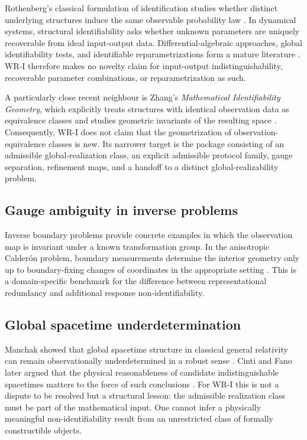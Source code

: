 \documentclass[11pt]{article}
\begin{document}
Rothenberg's classical formulation of identification studies whether distinct
underlying structures induce the same observable probability law
\cite{Rothenberg1971}. In dynamical systems, structural identifiability asks
whether unknown parameters are uniquely recoverable from ideal input-output
data. Differential-algebraic approaches, global identifiability tests, and
identifiable reparametrizations form a mature literature
\cite{Saccomani2003,Bellu2007,Villaverde2016,MeshkatSullivant2014}.
WR-I therefore makes no novelty claim for input-output indistinguishability,
recoverable parameter combinations, or reparametrization as such.

A particularly close recent neighbour is Zhang's \emph{Mathematical
Identifiability Geometry}, which explicitly treats structures with identical
observation data as equivalence classes and studies geometric invariants of the
resulting space \cite{Zhang2026}. Consequently, WR-I does not claim that the
geometrization of observation-equivalence classes is new. Its narrower target
is the package consisting of an admissible global-realization class, an
explicit admissible protocol family, gauge separation, refinement maps, and a
handoff to a distinct global-realizability problem.

\subsection{Gauge ambiguity in inverse problems}

Inverse boundary problems provide concrete examples in which the observation
map is invariant under a known transformation group. In the anisotropic
Calder\'on problem, boundary measurements determine the interior geometry only
up to boundary-fixing changes of coordinates in the appropriate setting
\cite{LassasLiimatainenSalo2020}. This is a domain-specific benchmark for the
difference between representational redundancy and additional response
non-identifiability.

\subsection{Global spacetime underdetermination}

Manchak showed that global spacetime structure in classical general relativity
can remain observationally underdetermined in a robust sense
\cite{Manchak2009}. Cinti and Fano later argued that the physical
reasonableness of candidate indistinguishable spacetimes matters to the force
of such conclusions \cite{CintiFano2021}. For WR-I this is not a dispute to be
resolved but a structural lesson: the admissible realization class must be
part of the mathematical input. One cannot infer a physically meaningful
non-identifiability result from an unrestricted class of formally constructible
objects.
\end{document}
